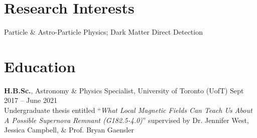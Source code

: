 \documentclass[10pt]{res} %
\begin{document}
\begin{resume}


\section{\Large Research Interests}
\vspace{-5pt} %
\noindent\makebox[\linewidth]{\rule{\textwidth}{0.4pt}}
\vspace{-20pt} %

Particle $\&$ Astro-Particle Physics; Dark Matter Direct Detection


\section{\Large Education}
\vspace{-5pt} %
\noindent\makebox[\linewidth]{\rule{\textwidth}{0.4pt}}
\vspace{-20pt} %

{\bf H.B.Sc.}, Astronomy \& Physics Specialist, University of Toronto (UofT) \hfill Sept 2017 -- June 2021 \\ 
Undergraduate thesis entitled ``\textit{What Local Magnetic Fields Can Teach Us About A Possible Supernova Remnant (G182.5-4.0)}'' supervised by Dr. Jennifer West, Jessica Campbell, $\&$ Prof. Bryan Gaensler
 




\end{resume}
\end{document}
